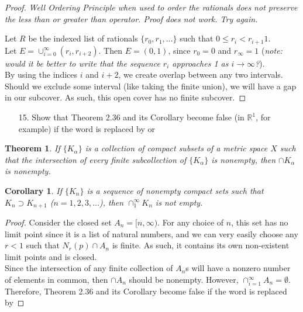 \documentclass[10pt]{article}
\theoremstyle{definition}
\theoremstyle{plain}
\newtheorem*{theorem*}{Theorem}
\newtheorem*{corollary*}{Corollary}
\newcommand{\R}{\mathbb{R}}
\begin{document}
\begin{proof}
\textit{Well Ordering Principle when used to order the rationals does not preserve the less than or greater than operator. Proof does not work. Try again.}

Let $R$ be the indexed list of rationals $\{r_0, r_1, \dots\}$ such that $0\leq r_i < r_{i+1}  1$. \\

Let $E=\cup_{i=0}^\infty (r_i, r_{i+2}).$ Then $E=(0,1)$, since $r_0=0$ and $r_\infty = 1$ (\textit{note: would it be better to write that the sequence $r_i$ approaches 1 as $i\rightarrow\infty$?}). \\

By using the indices $i$ and $i+2$, we create overlap between any two intervals. Should we exclude some interval (like taking the finite union), we will have a gap in our subcover. As such, this open cover has no finite subcover.
\end{proof}




\pagebreak





\begin{enumerate}
\item[15.] Show that Theorem 2.36 and its Corollary become false (in $\R^1$, for example) if the word  is replaced by  or 
\end{enumerate}
\setcounter{equation}{2}
\begin{theorem*}
If $\{K_\alpha\}$ is a collection of compact subsets of a metric space $X$ such that the intersection of every finite subcollection of $\{K_\alpha\}$ is nonempty, then $\cap K_\alpha$ is nonempty.
\end{theorem*}

\begin{corollary*}
If $\{K_n\}$ is a sequence of nonempty compact sets such that $K_n \supset K_{n+1}$ ($n=1,2,3,\dots$), then $\cap_1^\infty K_n$ is not empty.
\end{corollary*}

\begin{proof}
Consider the closed set $A_n=[n,\infty)$. For any choice of $n$, this set has no limit point since it is a list of natural numbers, and we can very easily choose any $r < 1$ such that $N_r(p)\cap A_n$ is finite. As such, it contains its own non-existent limit points and is closed. \\

Since the intersection of any finite collection of $A_n$s will have a nonzero number of elements in common, then $\cap A_n$ should be nonempty. However, $\cap_{i=1}^\infty A_n = \emptyset$. \\

Therefore, Theorem 2.36 and its Corollary become false if the word  is replaced by 
\end{proof}
\end{document}
